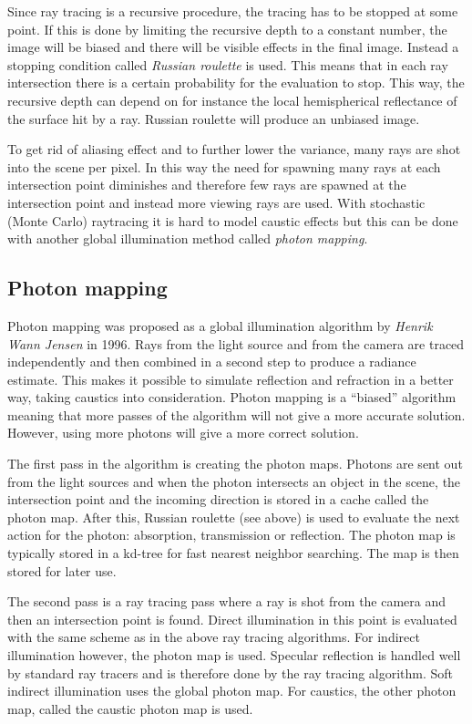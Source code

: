 \documentclass[a4paper]{report}
\begin{document}
Since ray tracing is a recursive procedure, the tracing has to be
stopped at some point. If this is done by limiting the recursive depth
to a constant number, the image will be biased and there will be
visible effects in the final image. Instead a stopping condition
called \emph{Russian roulette} is used. This means that in each ray
intersection there is a certain probability for the evaluation to
stop. This way, the recursive depth can depend on for instance the
local hemispherical reflectance of the surface hit by a ray. Russian
roulette will produce an unbiased image.

To get rid of aliasing effect and to further lower the variance, many
rays are shot into the scene per pixel. In this way the need for
spawning many rays at each intersection point diminishes and therefore
few rays are spawned at the intersection point and instead more
viewing rays are used. With stochastic (Monte Carlo) raytracing it is
hard to model caustic effects but this can be done with another
global illumination method called \emph{photon mapping}.

\subsection{Photon mapping}

Photon mapping was proposed as a global illumination algorithm by
\emph{Henrik Wann Jensen} \cite{jensen} in 1996. Rays from the light source
and from the camera are traced independently and then combined in a
second step to produce a radiance estimate. This makes it possible to
simulate reflection and refraction in a better way, taking caustics
into consideration. Photon mapping is a ``biased'' algorithm meaning
that more passes of the algorithm will not give a more accurate
solution. However, using more photons will give a more correct solution.

The first pass in the algorithm is creating the photon maps. Photons
are sent out from the light sources and when the photon intersects an
object in the scene, the intersection point and the incoming direction
is stored in a cache called the photon map. After this, Russian
roulette (see above) is used to evaluate the next action for the
photon: absorption, transmission or reflection. The photon map is
typically stored in a kd-tree for fast nearest neighbor searching. The
map is then stored for later use.

The second pass is a ray tracing pass where a ray is shot from the
camera and then an intersection point is found. Direct illumination in
this point is evaluated with the same scheme as in the above ray
tracing algorithms. For indirect illumination however, the photon map
is used. Specular reflection is handled well by standard ray tracers
and is therefore done by the ray tracing algorithm. Soft indirect
illumination uses the global photon map. For caustics, the other
photon map, called the caustic photon map is used.
\end{document}
